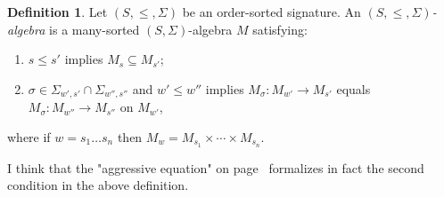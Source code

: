 \documentclass{article}
\theoremstyle{definition}
\theoremstyle{definition}
\theoremstyle{definition}
\newtheorem{definition}{Definition}[section]
\theoremstyle{definition}
\theoremstyle{definition}
\theoremstyle{theorem}
\theoremstyle{theorem}
\theoremstyle{theorem}
\theoremstyle{theorem}
\theoremstyle{theorem}
\begin{document}
{\begin{definition}
Let  $(S,\le,\Sigma)$ be an order-sorted signature. An \emph{ $(S,\le,\Sigma)$-algebra} is a many-sorted $(S,\Sigma)$-algebra $M$ satisfying:
\begin{enumerate}
\item $s\le s'$ implies $M_s\subseteq M_{s'}$;
\item $\sigma\in \Sigma_{w',s'}\cap\Sigma_{w'',s''}$ and $w'\le w''$ implies $M_\sigma:M_{w'}\to M_{s'}$ equals  $M_\sigma:M_{w''}\to M_{s''}$ on $M_{w'}$,
\end{enumerate}
where if $w=s_1\ldots s_n$ then $M_w=M_{s_1}\times\cdots\times M_{s_n}$.
\end{definition}
I think that the "aggressive equation" on page~\pageref{axiom-parametric-symbol} formalizes in fact the second condition in the above definition.
}
\end{document}
